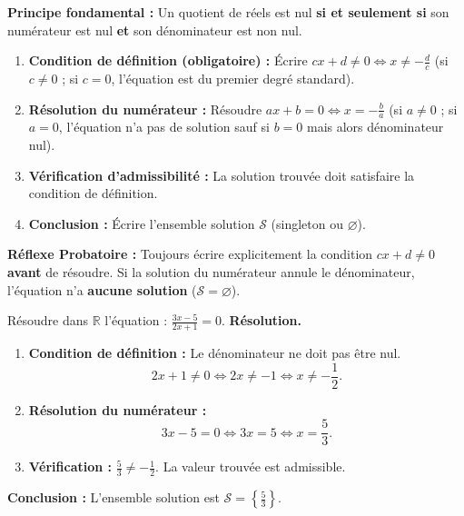 \documentclass[11pt]{article}
\begin{document}
\begin{methode}[Résoudre une équation $\frac{ax+b}{cx+d}=0$]
    \textbf{Principe fondamental :} Un quotient de réels est nul \textbf{si et seulement si} son numérateur est nul \textbf{et} son dénominateur est non nul.
    \begin{enumerate}
        \item \textbf{Condition de définition (obligatoire) :} Écrire $cx+d \neq 0 \iff x \neq -\frac{d}{c}$ (si $c \neq 0$ ; si $c=0$, l'équation est du premier degré standard).
        \item \textbf{Résolution du numérateur :} Résoudre $ax+b=0 \iff x = -\frac{b}{a}$ (si $a \neq 0$ ; si $a=0$, l'équation n'a pas de solution sauf si $b=0$ mais alors dénominateur nul).
        \item \textbf{Vérification d'admissibilité :} La solution trouvée doit satisfaire la condition de définition.
        \item \textbf{Conclusion :} Écrire l'ensemble solution $\mathcal{S}$ (singleton ou $\varnothing$).
    \end{enumerate}
    \textbf{Réflexe Probatoire :} Toujours écrire explicitement la condition $cx+d \neq 0$ \textbf{avant} de résoudre. Si la solution du numérateur annule le dénominateur, l'équation n'a \textbf{aucune solution} ($\mathcal{S}=\varnothing$).
\end{methode}

\begin{exoresolu}
    Résoudre dans $\mathbb{R}$ l'équation : $\frac{3x-5}{2x+1}=0$.
    \tcblower
    \textbf{Résolution.}
    \begin{enumerate}
        \item \textbf{Condition de définition :} Le dénominateur ne doit pas être nul.
        \[2x+1 \neq 0 \iff 2x \neq -1 \iff x \neq -\frac{1}{2}.\]
        \item \textbf{Résolution du numérateur :}
        \[3x-5=0 \iff 3x=5 \iff x=\frac{5}{3}.\]
        \item \textbf{Vérification :} $\frac{5}{3} \neq -\frac{1}{2}$. La valeur trouvée est admissible.
    \end{enumerate}
    \textbf{Conclusion :} L'ensemble solution est $\mathcal{S}=\left\{\frac{5}{3}\right\}$.
\end{exoresolu}
\end{document}
